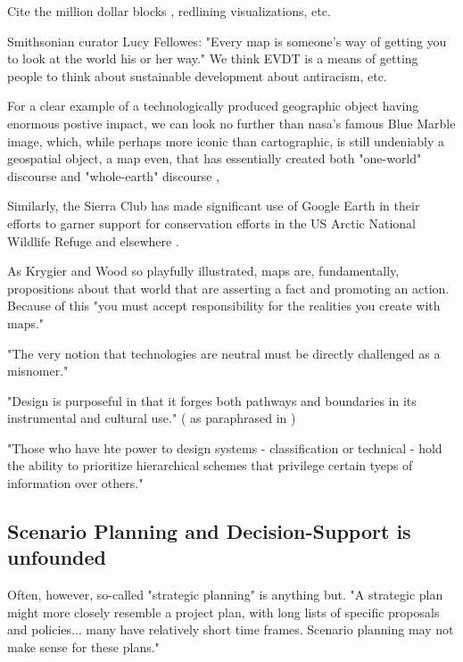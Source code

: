 Cite the million dollar blocks \cite{kurganCloseDistanceMapping2013}, redlining visualizations, etc.

Smithsonian curator Lucy Fellowes: "Every map is someone's way of getting you to look at the world his or her way." \cite{henriksonPowerPoliticsMaps1994} We think EVDT is a means of getting people to think about sustainable development about antiracism, etc. 

For a clear example of a technologically produced geographic object having enormous postive impact, we can look no further than \ac{nasa}'s famous Blue Marble image, which, while perhaps more iconic than cartographic, is still undeniably a geospatial object, a map even, that has essentially created both "one-world" discourse and "whole-earth" discourse \cite{propenCartographicRepresentationConstruction2011},  

Similarly, the Sierra Club has made significant use of Google Earth in their efforts to garner support for conservation efforts in the US Arctic National Wildlife Refuge and elsewhere \cite{propenCartographicRepresentationConstruction2011}. 

As Krygier and Wood so playfully illustrated, maps are, fundamentally, propositions about that world that are asserting a fact and promoting an action. Because of this "you must accept responsibility for the realities you create with maps." \cite{krygierCeEstPas2011}

"The very notion that technologies are neutral must be directly challenged as a misnomer." \cite{nobleAlgorithmsOppressionHow2018}

"Design is purposeful in that it forges both pathways and boundaries in its instrumental and cultural use." (\cite{paceyCultureTechnology1983} as paraphrased in \cite{nobleAlgorithmsOppressionHow2018})

"Those who have hte power to design systems - classification or technical - hold the ability to prioritize hierarchical schemes that privilege certain tyeps of information over others." \cite{nobleAlgorithmsOppressionHow2018}

\subsection{Scenario Planning and Decision-Support is unfounded}


Often, however, so-called "strategic planning" is anything but. "A strategic plan might more closely resemble a project plan, with long lists of specific proposals and policies... many have relatively short time frames. Scenario planning may not make sense for these plans." \cite{goodspeedScenarioPlanningCities2020}


